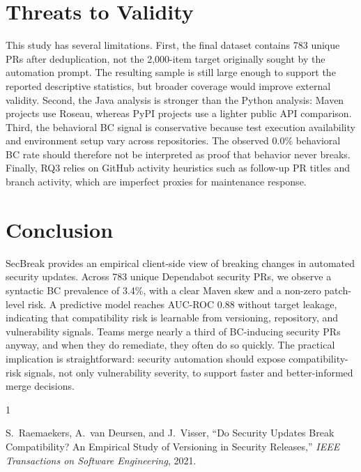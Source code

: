 \documentclass[10pt,journal]{IEEEtran}
\begin{document}
\section{Threats to Validity}
This study has several limitations. First, the final dataset contains 783 unique PRs after deduplication, not the 2{,}000-item target originally sought by the automation prompt. The resulting sample is still large enough to support the reported descriptive statistics, but broader coverage would improve external validity. Second, the Java analysis is stronger than the Python analysis: Maven projects use Roseau, whereas PyPI projects use a lighter public API comparison. Third, the behavioral BC signal is conservative because test execution availability and environment setup vary across repositories. The observed 0.0\% behavioral BC rate should therefore not be interpreted as proof that behavior never breaks. Finally, RQ3 relies on GitHub activity heuristics such as follow-up PR titles and branch activity, which are imperfect proxies for maintenance response.

\section{Conclusion}
SecBreak provides an empirical client-side view of breaking changes in automated security updates. Across 783 unique Dependabot security PRs, we observe a syntactic BC prevalence of 3.4\%, with a clear Maven skew and a non-zero patch-level risk. A predictive model reaches AUC-ROC 0.88 without target leakage, indicating that compatibility risk is learnable from versioning, repository, and vulnerability signals. Teams merge nearly a third of BC-inducing security PRs anyway, and when they do remediate, they often do so quickly. The practical implication is straightforward: security automation should expose compatibility-risk signals, not only vulnerability severity, to support faster and better-informed merge decisions.

\begin{thebibliography}{1}

S.~Raemaekers, A.~van Deursen, and J.~Visser, ``Do Security Updates Break
  Compatibility? An Empirical Study of Versioning in Security Releases,'' \emph{IEEE Transactions on Software Engineering}, 2021.

\end{thebibliography}
\end{document}
